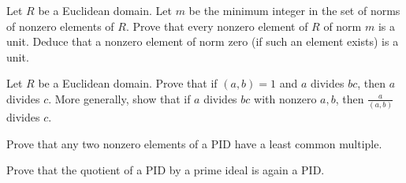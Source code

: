 \documentclass[12 pt, letterpaper]{hmcpset}
\begin{document}
\begin{problem}
	Let $R$ be a Euclidean domain. Let $m$ be the minimum integer in the set of norms of nonzero elements of $R$. Prove that every nonzero element of $R$ of norm $m$ is a unit. Deduce that a nonzero element of norm zero (if such an element exists) is a unit.
\end{problem}

\pagebreak

\begin{problem}
	Let $R$ be a Euclidean domain. Prove that if $(a, b) = 1$ and $a$ divides $bc$, then $a$ divides $c$. More generally, show that if $a$ divides $bc$ with nonzero $a, b$, then $\frac{a}{(a, b)}$ divides $c$.
\end{problem}

\pagebreak

\begin{problem}
	Prove that any two nonzero elements of a PID have a least common multiple.
\end{problem}

\pagebreak

\begin{problem}
	Prove that the quotient of a PID by a prime ideal is again a PID.
\end{problem}
\end{document}

